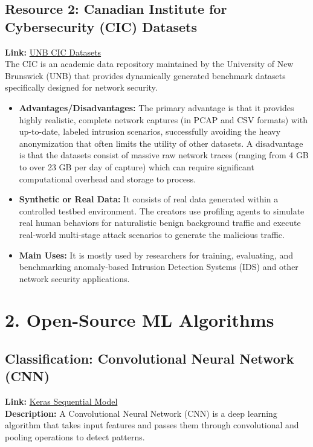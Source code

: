 \documentclass[letterpaper]{article}
\begin{document}
\subsection*{Resource 2: Canadian Institute for Cybersecurity (CIC) Datasets}
\textbf{Link:} \href{https://www.unb.ca/cic/datasets/index.html}{UNB CIC Datasets} \\
The CIC is an academic data repository maintained by the University of New Brunswick (UNB) that provides dynamically generated benchmark datasets specifically designed for network security.
\begin{itemize}
    \item \textbf{Advantages/Disadvantages:} The primary advantage is that it provides highly realistic, complete network captures (in PCAP and CSV formats) with up-to-date, labeled intrusion scenarios, successfully avoiding the heavy anonymization that often limits the utility of other datasets. A disadvantage is that the datasets consist of massive raw network traces (ranging from 4 GB to over 23 GB per day of capture) which can require significant computational overhead and storage to process.
    \item \textbf{Synthetic or Real Data:} It consists of real data generated within a controlled testbed environment. The creators use profiling agents to simulate real human behaviors for naturalistic benign background traffic and execute real-world multi-stage attack scenarios to generate the malicious traffic.
    \item \textbf{Main Uses:} It is mostly used by researchers for training, evaluating, and benchmarking anomaly-based Intrusion Detection Systems (IDS) and other network security applications.
\end{itemize}

\pagebreak
\section{2. Open-Source ML Algorithms}

\subsection*{Classification: Convolutional Neural Network (CNN)}
\textbf{Link:} \href{https://www.tensorflow.org/guide/keras/sequential_model}{Keras Sequential Model} \\
\textbf{Description:} A Convolutional Neural Network (CNN) is a deep learning algorithm that takes input features and passes them through convolutional and pooling operations to detect patterns. 
\end{document}
